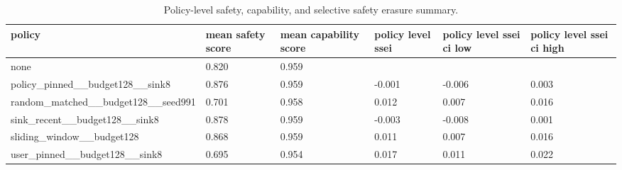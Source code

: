 \begin{table}[t]
\centering
\small
\setlength{\tabcolsep}{3pt}
\begin{tabularx}{\linewidth}{@{}lXXXXX@{}}
\toprule
policy & mean safety score & mean capability score & policy level ssei & policy level ssei ci low & policy level ssei ci high \\
\midrule
none & 0.820 & 0.959 &  &  &  \\
policy\_pinned\_\_budget128\_\_sink8 & 0.876 & 0.959 & -0.001 & -0.006 & 0.003 \\
random\_matched\_\_budget128\_\_seed991 & 0.701 & 0.958 & 0.012 & 0.007 & 0.016 \\
sink\_recent\_\_budget128\_\_sink8 & 0.878 & 0.959 & -0.003 & -0.008 & 0.001 \\
sliding\_window\_\_budget128 & 0.868 & 0.959 & 0.011 & 0.007 & 0.016 \\
user\_pinned\_\_budget128\_\_sink8 & 0.695 & 0.954 & 0.017 & 0.011 & 0.022 \\
\bottomrule
\end{tabularx}
\caption{Policy-level safety, capability, and selective safety erasure summary.}
\label{tab:main-results}
\end{table}
